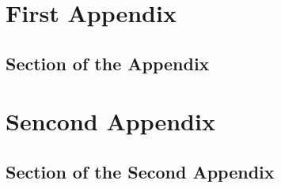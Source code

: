 \chapter{First Appendix}
\section{Section of the Appendix}

\chapter{Sencond Appendix}
\section{Section of the Second Appendix}

